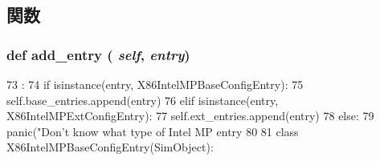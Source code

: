 \subsection{関数}
\hypertarget{classIntelMP_1_1X86IntelMPConfigTable_a17fa36c4d45882f7ccc656751b78f937}{
\subsubsection[{add\_\-entry}]{\setlength{\rightskip}{0pt plus 5cm}def add\_\-entry ( {\em self}, \/   {\em entry})}}
\label{classIntelMP_1_1X86IntelMPConfigTable_a17fa36c4d45882f7ccc656751b78f937}



\begin{DoxyCode}
73                               :
74         if isinstance(entry, X86IntelMPBaseConfigEntry):
75             self.base_entries.append(entry)
76         elif isinstance(entry, X86IntelMPExtConfigEntry):
77             self.ext_entries.append(entry)
78         else:
79             panic("Don't know what type of Intel MP entry %
80                     %
81 
class X86IntelMPBaseConfigEntry(SimObject):
\end{DoxyCode}


